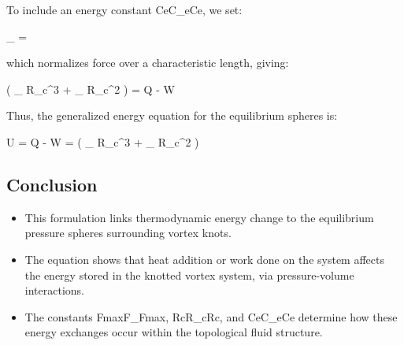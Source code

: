 To include an energy constant CeC_eCe, we set:

_{\scriptscriptstyle\boldsymbol{\circlearrowleft}} = 

which normalizes force over a characteristic length, giving:

\Delta \left(  \pi {}_{\scriptscriptstyle\boldsymbol{\circlearrowleft}} R_c^3 +  _{\scriptscriptstyle\boldsymbol{\circlearrowleft}} R_c^2 \right) = Q - W

Thus, the generalized energy equation for the equilibrium spheres is:

\Delta U = Q - W = \Delta \left(  \pi {}_{\scriptscriptstyle\boldsymbol{\circlearrowleft}} R_c^3 +  _{\scriptscriptstyle\boldsymbol{\circlearrowleft}} R_c^2 \right)



\subsection*{Conclusion}
\begin{itemize}
\item This formulation links thermodynamic energy change to the equilibrium pressure spheres surrounding vortex knots.


\item The equation shows that heat addition or work done on the system affects the energy stored in the knotted vortex system, via pressure-volume interactions.


\item The constants Fmax⁡F_{\max}Fmax, RcR_cRc, and CeC_eCe determine how these energy exchanges occur within the topological fluid structure.


\end{itemize}